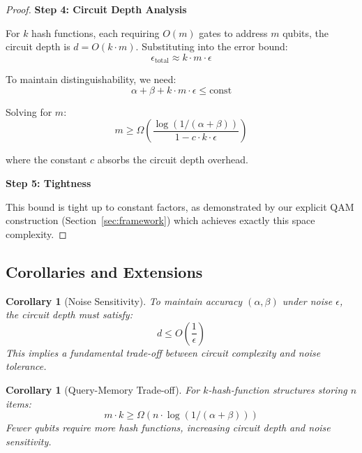 \documentclass[11pt,letterpaper]{article}
\newtheorem{corollary}[theorem]{Corollary}
\begin{document}
\begin{proof}
\textbf{Step 4: Circuit Depth Analysis}

For $k$ hash functions, each requiring $O(m)$ gates to address $m$ qubits, the circuit depth is $d = O(k \cdot m)$. Substituting into the error bound:
\begin{equation}
\epsilon_{\text{total}} \approx k \cdot m \cdot \epsilon
\end{equation}

To maintain distinguishability, we need:
\begin{equation}
\alpha + \beta + k \cdot m \cdot \epsilon \leq \text{const}
\end{equation}

Solving for $m$:
\begin{equation}
m \geq \Omega\left(\frac{\log(1/(\alpha + \beta))}{1 - c \cdot k \cdot \epsilon}\right)
\end{equation}

where the constant $c$ absorbs the circuit depth overhead.

\textbf{Step 5: Tightness}

This bound is tight up to constant factors, as demonstrated by our explicit QAM construction (Section~\ref{sec:framework}) which achieves exactly this space complexity.
\end{proof}

\subsection{Corollaries and Extensions}

\begin{corollary}[Noise Sensitivity]
\label{cor:noise_sensitivity}
To maintain accuracy $(\alpha, \beta)$ under noise $\epsilon$, the circuit depth must satisfy:
\begin{equation}
d \leq O\left(\frac{1}{\epsilon}\right)
\end{equation}
This implies a fundamental trade-off between circuit complexity and noise tolerance.
\end{corollary}

\begin{corollary}[Query-Memory Trade-off]
\label{cor:query_memory}
For $k$-hash-function structures storing $n$ items:
\begin{equation}
m \cdot k \geq \Omega(n \cdot \log(1/(\alpha + \beta)))
\end{equation}
Fewer qubits require more hash functions, increasing circuit depth and noise sensitivity.
\end{corollary}
\end{document}
